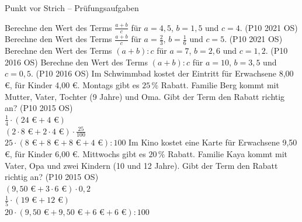 \begin{aufgabe}{Punkt vor Strich – Prüfungsaufgaben}
\begin{teile}
\teil Berechne den Wert des Terms $\frac{a + b}{c}$ für $a = 4{,}5$, $b = 1{,}5$ und $c = 4$. \hfill (P10 2021 OS)
\teil Berechne den Wert des Terms $\frac{a + b}{c}$ für $a = \frac{2}{3}$, $b = \frac{1}{6}$ und $c = 5$. \hfill (P10 2021 OS)
\teil Berechne den Wert des Terms $(a + b) : c$ für $a = 7$, $b = 2{,}6$ und $c = 1{,}2$. \hfill (P10 2016 OS)
\teil Berechne den Wert des Terms $(a + b) : c$ für $a = 10$, $b = 3{,}5$ und $c = 0{,}5$. \hfill (P10 2016 OS)
\teil Im Schwimmbad kostet der Eintritt für Erwachsene 8,00 €, für Kinder 4,00 €. Montags gibt es $25\,\%$ Rabatt. Familie Berg kommt mit Mutter, Vater, Tochter (9 Jahre) und Oma. Gibt der Term den Rabatt richtig an? \hfill (P10 2015 OS)\\
$\frac{1}{4} \cdot (24\text{ €} + 4\text{ €})$ \janein\\
$(2 \cdot 8\text{ €} + 2 \cdot 4\text{ €}) \cdot \frac{25}{100}$ \janein\\
$25 \cdot (8\text{ €} + 8\text{ €} + 8\text{ €} + 4\text{ €}) : 100$ \janein
\teil Im Kino kostet eine Karte für Erwachsene 9,50 €, für Kinder 6,00 €. Mittwochs gibt es $20\,\%$ Rabatt. Familie Kaya kommt mit Vater, Opa und zwei Kindern (10 und 12 Jahre). Gibt der Term den Rabatt richtig an? \hfill (P10 2015 OS)\\
$(9{,}50\text{ €} + 3 \cdot 6\text{ €}) \cdot 0{,}2$ \janein\\
$\frac{1}{5} \cdot (19\text{ €} + 12\text{ €})$ \janein\\
$20 \cdot (9{,}50\text{ €} + 9{,}50\text{ €} + 6\text{ €} + 6\text{ €}) : 100$ \janein
\end{teile}
\end{aufgabe}
